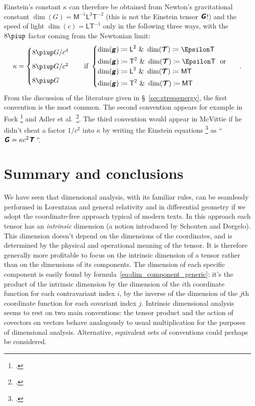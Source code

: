 \documentclass[\ifafour a4paper,12pt,\else a5paper,10pt,\fi%
onecolumn,oneside,article,%
british%
]{memoir}
\theoremstyle{remark}
\theoremstyle{innote}
\newcommand*{\mathte}[1]{\textbf{\textit{\textsf{#1}}}}
\newcommand*{\citep}{\footcites}
\newcommand*{\amp}{\&}
\newcommand*{\pu}{\piup}%
\newcommand*{\defd}{\coloneqq}
\renewcommand*{\|}[1][]{\nonscript\,#1\vert\nonscript\;\mathopen{}}
\newcommand*{\sect}{\S}%
\newcommand*{\eqn}{eq.}%
\newcommand*{\eqns}{eqs}%
\newcommand*{\etal}{{et al.}}
\newcommand*{\Le}{\textsf{L}}
\newcommand*{\Ti}{\textsf{T}}
\newcommand*{\Ma}{\textsf{M}}
\newcommand*{\En}{\Epsilon}%
\newcommand*{\yg}{\mathte{g}}
\newcommand*{\yT}{\bm{\mathcal{T}}}
\newcommand*{\yTe}{\mathte{T}}
\newcommand*{\yG}{\mathte{G}}
\newcommand*{\yk}{\kappa}
\begin{document}
Einstein's constant $\yk$ can therefore be obtained from Newton's
gravitational constant $\dim(G)=\Ma^{-1}\Le^{3}\Ti^{-2}$ (this is not the
Einstein tensor $\yG$!) and the speed of light $\dim(c)=\Le\Ti^{-1}$ only
in the following three ways, with the $8\pu$ factor coming from the
Newtonian limit:
\begin{equation}
\label{eq:dim_k_Gc}
\yk =
\begin{cases}
  8\pu G/c^{4} \\[2\jot]
  8\pu G/c^{2} \\[2\jot]
  8\pu G 
  \end{cases}
  \quad\text{if }
  \begin{cases}
\dim(\yg)\defd \Le^2 \text{ \amp\ }\dim(\yT)\defd \En\Ti \\[\jot]
    \dim(\yg)\defd \Ti^2 \text{ \amp\ }\dim(\yT)\defd \En\Ti 
    \ \text{ or }\\
\dim(\yg)\defd \Le^2 \text{ \amp\ }\dim(\yT)\defd \Ma\Ti \\[\jot]
\dim(\yg)\defd \Ti^2 \text{ \amp\ }\dim(\yT)\defd \Ma\Ti
  \end{cases} \ .
\end{equation}
From the discussion of the literature given in
\sect~\ref{sec:stressenergy}, the first convention is the most common. The
second convention appears for example in Fock \citep[\sect~55 \eqns~(55.15)
and~(52.06)]{fock1955_t1964} and Adler \etal\ \citep[\sect~10.5
\eqn~(10.98)]{adleretal1965_r1975}. The third convention would appear in
McVittie if he didn't cheat a factor $1/c^{2}$ into $\yk$ by writing the
Einstein equations \citep[\sect~4.2 \eqn~(4.107)]{mcvittie1956_r1965} as
\enquote{\,$\yG = \yk c^{2} \yTe$\,}.



\section{Summary and conclusions}
\label{sec:summary}

We have seen that dimensional analysis, with its familiar rules, can be
seamlessly performed in Lorentzian and general relativity and in
differential geometry if we adopt the coordinate-free approach typical of
modern texts. In this approach each tensor has an \emph{intrinsic}
dimension (a notion introduced by Schouten and Dorgelo). This dimension
doesn't depend on the dimensions of the coordinates, and is determined by
the physical and operational meaning of the tensor. It is therefore
generally more profitable to focus on the intrinsic dimension of a tensor
rather than on the dimensions of its components. The dimension of each
specific component is easily found by
formula~\eqref{eq:dim_component_generic}: it's the product of the intrinsic
dimension by the dimension of the $i$th coordinate function for each
contravariant index $i$, by the inverse of the dimension of the $j$th
coordinate function for each covariant index $j$. Intrinsic dimensional
analysis seems to rest on two main conventions: the tensor product and the
action of covectors on vectors behave analogously to usual multiplication
for the purposes of dimensional analysis. Alternative, equivalent sets of
conventions could perhaps be considered.
\end{document}
